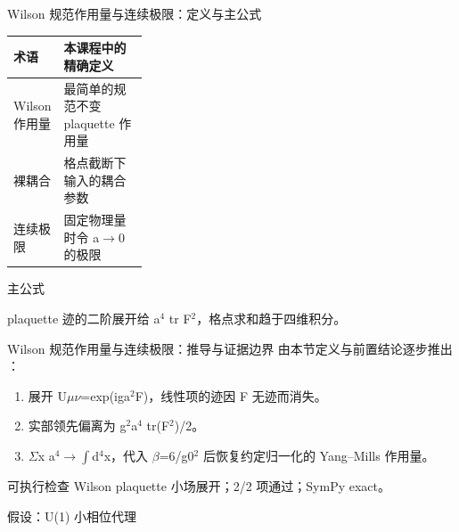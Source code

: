 \begin{frame}[t]{Wilson 规范作用量与连续极限：定义与主公式}
\footnotesize\begin{tabularx}{\linewidth}{p{0.30\linewidth}Y}
\toprule 术语 & 本课程中的精确定义\\\midrule
{} Wilson 作用量 & 最简单的规范不变 plaquette 作用量\\
 裸耦合 & 格点截断下输入的耦合参数\\
 连续极限 & 固定物理量时令 a\ensuremath{\rightarrow}0 的极限\\
\bottomrule\end{tabularx}\vspace{0.15cm}
\begin{block}{ 主公式}\centering{}\end{block}
plaquette 迹的二阶展开给 a\ensuremath{^{4}} tr F\ensuremath{^{2}}，格点求和趋于四维积分。
\end{frame}

\begin{frame}[t]{Wilson 规范作用量与连续极限：推导与证据边界}
\footnotesize
{}\quad 由本节定义与前置结论逐步推出 ：
\begin{enumerate}
\item 展开 U\ensuremath{\mu}\ensuremath{\nu}=exp(iga\ensuremath{^{2}}F)，线性项的迹因 F 无迹而消失。
\item 实部领先偏离为 g\ensuremath{^{2}}a\ensuremath{^{4}} tr(F\ensuremath{^{2}})/\allowbreak{}2。
\item \ensuremath{\Sigma}x a\ensuremath{^{4}}\ensuremath{\rightarrow}\ensuremath{\int}d\ensuremath{^{4}}x，代入 \ensuremath{\beta}=6/\allowbreak{}g0\ensuremath{^{2}} 后恢复约定归一化的 Yang--Mills 作用量。
\end{enumerate}\begin{block}{可执行检查}
\quad Wilson plaquette 小场展开；2/2 项通过；SymPy exact。
\par\scriptsize 假设：U(1) 小相位代理
\end{block}
\end{frame}

